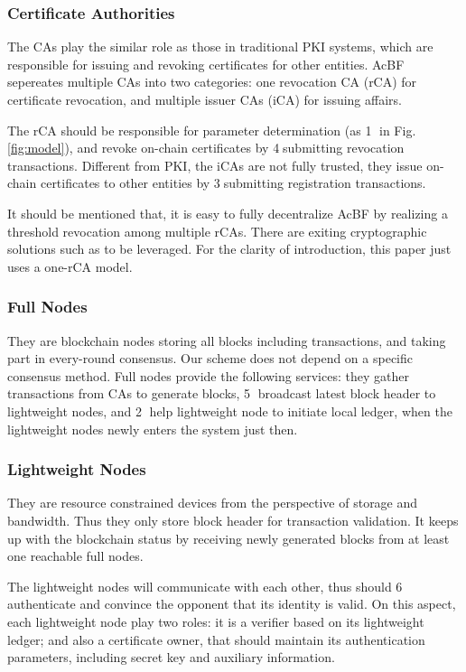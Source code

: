 \documentclass[conference]{IEEEtran}
\begin{document}
\subsubsection{Certificate Authorities}
 The CAs play the similar role as those in traditional PKI systems, which are responsible for issuing and revoking certificates for other entities. AcBF sepereates multiple CAs into two categories: one revocation CA (rCA) for certificate revocation, and multiple issuer CAs (iCA) for issuing affairs. 
 
 The rCA should be responsible for parameter determination (as \textcircled{1} in Fig. \ref{fig:model}), and revoke on-chain certificates by \textcircled{4}submitting revocation transactions. Different from PKI, the iCAs are not fully trusted, they issue on-chain certificates to other entities by \textcircled{3}submitting registration transactions. 

It should be mentioned that, it is easy to fully decentralize AcBF by realizing a threshold revocation among multiple rCAs. There are exiting cryptographic solutions such as \cite{Gennaro2019FullyDG} to be leveraged. 
For the clarity of introduction, this paper just uses a one-rCA model. 

\subsubsection{Full Nodes}
They are blockchain nodes storing all blocks including transactions, and taking part in every-round consensus. Our scheme does not depend on a specific consensus method. Full nodes provide the following services: they gather transactions from CAs to generate blocks, \textcircled{5} broadcast latest block header to lightweight nodes, and \textcircled{2} help lightweight node to initiate local ledger,  when the lightweight nodes newly enters the system just then. 

\subsubsection{Lightweight Nodes}
They are resource constrained devices from the perspective of storage and bandwidth. Thus they only store block header for transaction validation. 
It keeps up with the blockchain status by receiving newly generated blocks from at least one reachable full nodes. 

The lightweight nodes will communicate with each other, thus should \textcircled{6} authenticate and convince the opponent that its identity is valid. On this aspect, each lightweight node play two roles: it is a verifier based on its lightweight ledger; and also a certificate owner, that should maintain its authentication parameters, including secret key and auxiliary information.
\end{document}
